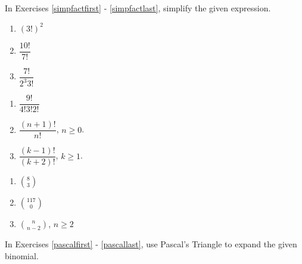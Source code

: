 In Exercises \ref{simpfactfirst} - \ref{simpfactlast},  simplify the given expression.

\begin{multicols}{3}
\begin{enumerate}

\item  $\left(3!\right)^2$ \label{simpfactfirst}


\item  $\dfrac{10!}{7!}$


\item  $\dfrac{7!}{2^3 3!}$

\setcounter{HW}{\value{enumi}}
\end{enumerate}
\end{multicols}

\begin{multicols}{3}
\begin{enumerate}
\setcounter{enumi}{\value{HW}}



\item  $\dfrac{9!}{4! 3! 2!}$


\item  $\dfrac{(n+1)!}{n!}$, $n \geq 0$.


\item  $\dfrac{(k-1)!}{(k+2)!}$, $k \geq 1$.

\setcounter{HW}{\value{enumi}}
\end{enumerate}
\end{multicols}

\begin{multicols}{3}
\begin{enumerate}
\setcounter{enumi}{\value{HW}}



\item  $\displaystyle{\binom{8}{3}}$


\item  $\displaystyle{\binom{117}{0}}$


\item  $\displaystyle{\binom{n}{n-2}}$, $n \geq 2$ \label{simpfactlast}


\setcounter{HW}{\value{enumi}}
\end{enumerate}
\end{multicols}


In Exercises \ref{pascalfirst} - \ref{pascallast}, use Pascal's Triangle to expand the given binomial.

